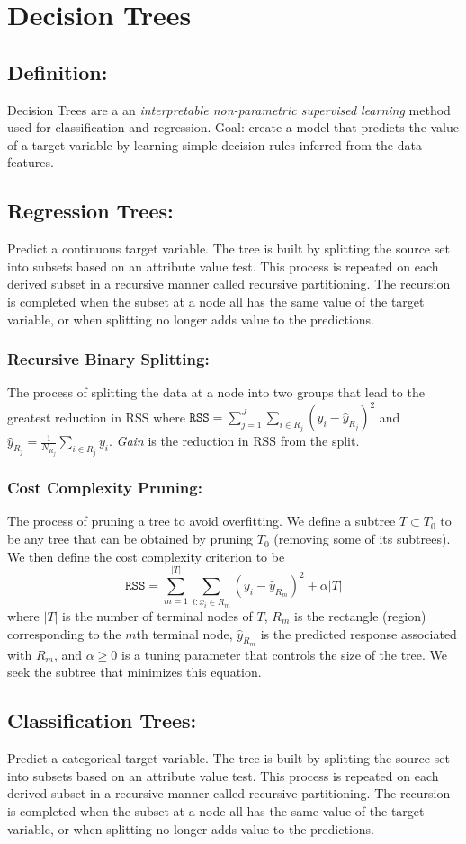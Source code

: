 \section{Decision Trees}
\subsection{Definition:} Decision Trees are a an \emph{interpretable non-parametric supervised learning} method used for classification and regression. Goal: create a model that predicts the value of a target variable by learning simple decision rules inferred from the data features.
\subsection{Regression Trees:} Predict a continuous target variable. The tree is built by splitting the source set into subsets based on an attribute value test. This process is repeated on each derived subset in a recursive manner called recursive partitioning. The recursion is completed when the subset at a node all has the same value of the target variable, or when splitting no longer adds value to the predictions.
\subsubsection{Recursive Binary Splitting:} The process of splitting the data at a node into two groups that lead to the greatest reduction in RSS where $\mathtt{RSS}= \sum_{j=1}^{J}\sum_{i\in R_j}(y_i-\hat{y}_{R_j})^2$ and $\hat{y}_{R_j}=\frac{1}{N_{R_j}}\sum_{i\in R_j}y_i$. \emph{Gain} is the reduction in RSS from the split.
\subsubsection{Cost Complexity Pruning:} The process of pruning a tree to avoid overfitting. We define a subtree $T \subset T_0$ to be any tree that can be obtained by pruning $T_0$ (removing some of its subtrees). We then define the cost complexity criterion to be \[\mathtt{RSS} =\sum_{m=1}^{|T|}\sum_{i:x_i\in R_m}(y_i-\hat{y}_{R_m})^2+\alpha|T|\] where $|T|$ is the number of terminal nodes of $T$, $R_m$ is the rectangle (region) corresponding to the $m$th terminal node, $\hat{y}_{R_m}$ is the predicted response associated with $R_m$, and $\alpha\geq 0$ is a tuning parameter that controls the size of the tree. We seek the subtree that minimizes this equation.
\subsection{Classification Trees:} Predict a categorical target variable. The tree is built by splitting the source set into subsets based on an attribute value test. This process is repeated on each derived subset in a recursive manner called recursive partitioning. The recursion is completed when the subset at a node all has the same value of the target variable, or when splitting no longer adds value to the predictions.
